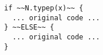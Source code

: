 \begin{lstlisting}[style=scalaioScala]
if ~~N.typep(x)~~ {
  ... original code ...
} ~~ELSE~~ {
  ... original code ...
}
\end{lstlisting}
